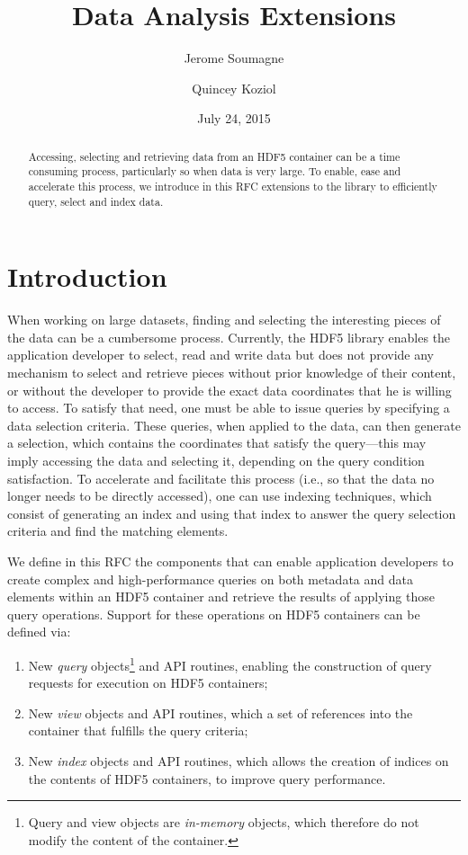 \documentclass[letterpaper,hyper]{THG_RFC}
\title{Data Analysis Extensions}
\author{Jerome Soumagne}
\author{Quincey Koziol}
\date{July 24, 2015}
\begin{document}

\maketitle

\begin{abstract}
Accessing, selecting and retrieving data from an HDF5 container can be a time
consuming process, particularly so when data is very large. To enable, ease and 
accelerate this process, we introduce in this RFC extensions to the library
to efficiently query, select and index data.
\end{abstract}

\section{Introduction}
When working on large datasets, finding and selecting the interesting pieces of
the data can be a cumbersome process. Currently, the HDF5 library enables the 
application developer to select, read and write data but does not provide any 
mechanism to select and retrieve pieces without prior knowledge of their
content, or without the developer to provide the exact data coordinates that
he is willing to access. To satisfy that need, one must be able
to issue queries by specifying a data selection criteria. These queries,
when applied to the data, can then generate a selection, which contains the coordinates
that satisfy the query---this may imply accessing the data and selecting it,
depending on the query condition satisfaction. To accelerate and facilitate this
process (i.e., so that the data no longer needs to be directly accessed), one can
use indexing techniques, which consist of generating an index and using that index
to answer the query selection criteria and find the matching elements.

We define in this RFC the components that can enable application developers to
create complex and high-performance queries on both metadata and data elements
within an HDF5 container and retrieve the results of applying those query
operations. Support for these operations on HDF5 containers can be defined via:
\begin{enumerate}
\item New \textit{query} objects\footnote{Query and view objects are
\textit{in-memory} objects, which therefore do not modify the content of the
container.\label{fn:object}} and API routines, enabling the construction of
query requests for execution on HDF5 containers;
\item New \textit{view} objects and API routines, which
 a set of references into the
container that fulfills the query criteria;
\item New \textit{index} objects and API routines, which allows the creation of
indices on the contents of HDF5 containers, to improve query performance.
\end{enumerate}
\end{document}
